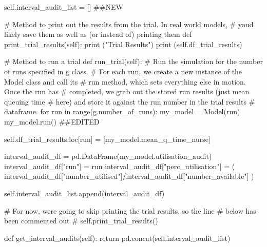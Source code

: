 \documentclass[
  letterpaper,
  DIV=11,
  numbers=noendperiod]{scrreprt}
\newenvironment{Shaded}{}{}
\newcommand{\BuiltInTok}[1]{\textcolor[rgb]{0.84,0.23,0.29}{#1}}
\newcommand{\CommentTok}[1]{\textcolor[rgb]{0.42,0.45,0.49}{#1}}
\newcommand{\ControlFlowTok}[1]{\textcolor[rgb]{0.84,0.23,0.29}{#1}}
\newcommand{\KeywordTok}[1]{\textcolor[rgb]{0.84,0.23,0.29}{#1}}
\newcommand{\NormalTok}[1]{\textcolor[rgb]{0.14,0.16,0.18}{#1}}
\newcommand{\OperatorTok}[1]{\textcolor[rgb]{0.14,0.16,0.18}{#1}}
\newcommand{\StringTok}[1]{\textcolor[rgb]{0.01,0.18,0.38}{#1}}
\newcommand{\VariableTok}[1]{\textcolor[rgb]{0.89,0.38,0.04}{#1}}
\begin{document}
\begin{tcolorbox}
\begin{Shaded}
\begin{Highlighting}[]
        \VariableTok{self}\NormalTok{.interval\_audit\_list }\OperatorTok{=}\NormalTok{ [] }\CommentTok{\#\#NEW}

    \CommentTok{\# Method to print out the results from the trial.  In real world models,}
    \CommentTok{\# you\textquotesingle{}d likely save them as well as (or instead of) printing them}
    \KeywordTok{def}\NormalTok{ print\_trial\_results(}\VariableTok{self}\NormalTok{):}
        \BuiltInTok{print}\NormalTok{ (}\StringTok{"Trial Results"}\NormalTok{)}
        \BuiltInTok{print}\NormalTok{ (}\VariableTok{self}\NormalTok{.df\_trial\_results)}

    \CommentTok{\# Method to run a trial}
    \KeywordTok{def}\NormalTok{ run\_trial(}\VariableTok{self}\NormalTok{):}
        \CommentTok{\# Run the simulation for the number of runs specified in g class.}
        \CommentTok{\# For each run, we create a new instance of the Model class and call its}
        \CommentTok{\# run method, which sets everything else in motion.  Once the run has}
        \CommentTok{\# completed, we grab out the stored run results (just mean queuing time}
        \CommentTok{\# here) and store it against the run number in the trial results}
        \CommentTok{\# dataframe.}
        \ControlFlowTok{for}\NormalTok{ run }\KeywordTok{in} \BuiltInTok{range}\NormalTok{(g.number\_of\_runs):}
\NormalTok{            my\_model }\OperatorTok{=}\NormalTok{ Model(run)}
\NormalTok{            my\_model.run() }\CommentTok{\#\#EDITED}

            \VariableTok{self}\NormalTok{.df\_trial\_results.loc[run] }\OperatorTok{=}\NormalTok{ [my\_model.mean\_q\_time\_nurse]}

\NormalTok{            interval\_audit\_df }\OperatorTok{=}\NormalTok{ pd.DataFrame(my\_model.utilisation\_audit)}
\NormalTok{            interval\_audit\_df[}\StringTok{"run"}\NormalTok{] }\OperatorTok{=}\NormalTok{ run}
\NormalTok{            interval\_audit\_df[}\StringTok{"perc\_utilisation"}\NormalTok{] }\OperatorTok{=}\NormalTok{ (}
\NormalTok{              interval\_audit\_df[}\StringTok{"number\_utilised"}\NormalTok{]}\OperatorTok{/}\NormalTok{interval\_audit\_df[}\StringTok{"number\_available"}\NormalTok{]}
\NormalTok{            )}

            \VariableTok{self}\NormalTok{.interval\_audit\_list.append(interval\_audit\_df)}

        \CommentTok{\# For now, we\textquotesingle{}re going to skip printing the trial results, so the line}
        \CommentTok{\# below has been commented out}
        \CommentTok{\# self.print\_trial\_results()}

    \KeywordTok{def}\NormalTok{ get\_interval\_audits(}\VariableTok{self}\NormalTok{):}
      \ControlFlowTok{return}\NormalTok{ pd.concat(}\VariableTok{self}\NormalTok{.interval\_audit\_list)}
\end{Highlighting}
\end{Shaded}

\end{tcolorbox}
\end{document}
